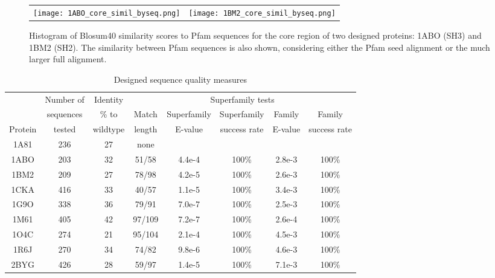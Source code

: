     \begin{figure}[!htbp]
      \centering
      \begin{tabular}{cc}
        \texttt{[image: 1ABO\_core\_simil\_byseq.png]} &
        \texttt{[image: 1BM2\_core\_simil\_byseq.png]} \\
      \end{tabular}
      \caption{Histogram of Blosum40 similarity scores to Pfam sequences for the core region of two
designed proteins: 1ABO (SH3) and 1BM2 (SH2). The similarity between Pfam sequences is
also shown, considering either the Pfam seed alignment or the much larger full alignment.
} 
      \label{fig:similarity}
    \end{figure}





\begin{table}[!htbp]                            
\caption{Designed sequence quality measures}
\small
\label{tab:quality}                      
\begin{center}
\begin{tabular}{cccccccc} \hline \hline  
        & Number of & Identity & \multicolumn{5}{c}{\hrulefill Superfamily tests \hrulefill}   \\
        & sequences & \% to    & Match & Superfamily & Superfamily  & Family  & Family        \\
Protein & tested    & wildtype & length & E-value     & success rate & E-value & success rate  \\ \hline
1A81    & 236       & 27       & none   &             &              &         &               \\
1ABO    & 203       & 32       & 51/58  & 4.4e-4      & 100\%        & 2.8e-3  & 100\%         \\
1BM2    & 209       & 27       & 78/98  & 4.2e-5      & 100\%        & 2.6e-3  & 100\%         \\
1CKA    & 416       & 33       & 40/57  & 1.1e-5      & 100\%        & 3.4e-3  & 100\%         \\
1G9O    & 338       & 36       & 79/91  & 7.0e-7      & 100\%        & 2.5e-3  & 100\%         \\
1M61    & 405       & 42       & 97/109 & 7.2e-7      & 100\%        & 2.6e-4  & 100\%         \\
1O4C    & 274       & 21       & 95/104 & 2.1e-4      & 100\%        & 4.5e-3  & 100\%         \\
1R6J    & 270       & 34       & 74/82  & 9.8e-6      & 100\%        & 4.6e-3  & 100\%         \\
2BYG    & 426       & 28       & 59/97  & 1.4e-5      & 100\%        & 7.1e-3  & 100\%         \\ \hline
\end{tabular}
\end{center}
\end{table}



